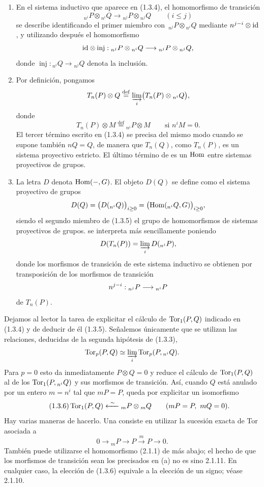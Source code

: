\begin{enumerate}[label=\alph*)]
\item En el sistema inductivo que aparece en (1.3.4), el homomorfismo
de transición
\[
 {}_{n^i}P\otimes{}_{n^i}Q
 \longrightarrow
 {}_{n^j}P\otimes{}_{n^j}Q
 \qquad(i\leq j)
\]
se describe identificando el primer miembro con
$\,{}_{n^j}P\otimes{}_{n^i}Q$ mediante
$n^{j-i}\otimes\id$, y utilizando después el homomorfismo
\[
 \id\otimes\operatorname{inj}:
 {}_{n^j}P\otimes{}_{n^i}Q
 \longrightarrow
 {}_{n^j}P\otimes{}_{n^j}Q,
\]
donde
$\operatorname{inj}:{}_{n^i}Q\longrightarrow{}_{n^j}Q$
denota la inclusión.


\item Por definición, pongamos
\[
 T_n(P)\otimes Q
 \overset{\mathrm{def}}{=}
 \varinjlim_i\bigl(T_n(P)\otimes{}_{n^i}Q\bigr),
\]
donde
\[
 T_n(P)\otimes M
 \overset{\mathrm{def}}{=}
 {}_{n^i}P\otimes M
 \qquad\text{si }n^iM=0.
\]
El tercer término escrito en (1.3.4) se precisa del mismo modo cuando
se supone también $nQ=Q$, de manera que $T_n(Q)$, como $T_n(P)$, es
un sistema proyectivo estricto. El último término de
 es un $\Hom$ entre sistemas proyectivos de
grupos.

\item La letra $D$ denota $\uHom(-,G)$. El objeto $D(Q)$ se define
como el sistema proyectivo de grupos
\[
 D(Q)=\bigl(D({}_{n^i}Q)\bigr)_{i\geq0}
 =\bigl(\uHom({}_{n^i}Q,G)\bigr)_{i\geq0},
\]
siendo el segundo miembro de (1.3.5) el grupo de homomorfismos de
sistemas proyectivos de grupos.  se interpreta más sencillamente poniendo
\[
 D(T_n(P))=\varinjlim_iD({}_{n^i}P),
\]
donde los morfismos de transición de este sistema inductivo se
obtienen por transposición de los morfismos de transición
\[
 \sisi{n^{j-1}}{n^{j-i}}:{}_{n^j}P\longrightarrow{}_{n^i}P
\]
de $T_n(P)$.
\end{enumerate}


Dejamos al lector la tarea de explicitar el cálculo de $\Tor_1(P,Q)$
indicado en (1.3.4) y de deducir de él (1.3.5). Señalemos únicamente
que se utilizan las relaciones, deducidas de la segunda hipótesis de
(1.3.3),
\[
 \Tor_p(P,Q)\simeq
 \varinjlim_i\Tor_p(P,{}_{n^i}Q).
\]
Para $p=0$ esto da inmediatamente $P\otimes Q=0$ y reduce el cálculo
de $\Tor_1(P,Q)$ al de los $\Tor_1(P,{}_{n^i}Q)$ y sus morfismos de
transición. Así, cuando $Q$ está anulado por un entero $m=n^i$ tal que
$mP=P$, queda por explicitar un isomorfismo
\begin{equation}\tag{1.3.6}
 \Tor_1(P,Q)
 \xleftarrow{\ \sim\ }
 {}_mP\otimes{}_mQ
 \qquad(mP=P,\ mQ=0).
\end{equation}
Hay varias maneras de hacerlo. Una consiste en utilizar la sucesión
exacta de Tor asociada a
\[
 0\longrightarrow{}_mP\longrightarrow P
 \xrightarrow{\ m\ }P\longrightarrow0.
\]
También puede utilizarse el homomorfismo (2.1.1) de más abajo; el hecho
de que los morfismos de transición sean los precisados en (a) no es
sino 2.1.11. En cualquier caso, la elección de (1.3.6) equivale a la
elección de un signo; véase 2.1.10.


